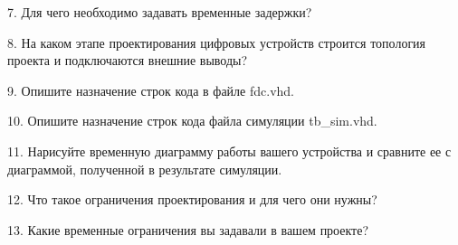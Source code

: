\begin{sloppypar}
7. Для чего необходимо задавать временные задержки?


8. На каком этапе проектирования цифровых устройств строится топология проекта и подключаются внешние выводы?


9. Опишите назначение строк кода в файле fdc.vhd.


10. Опишите назначение строк кода файла симуляции tb\_sim.vhd.


11. Нарисуйте временную диаграмму работы вашего устройства и сравните ее с диаграммой, полученной в результате симуляции.


12. Что такое ограничения проектирования и для чего они нужны?


13. Какие временные ограничения вы задавали в вашем проекте?




% 
% 


\end{sloppypar}
